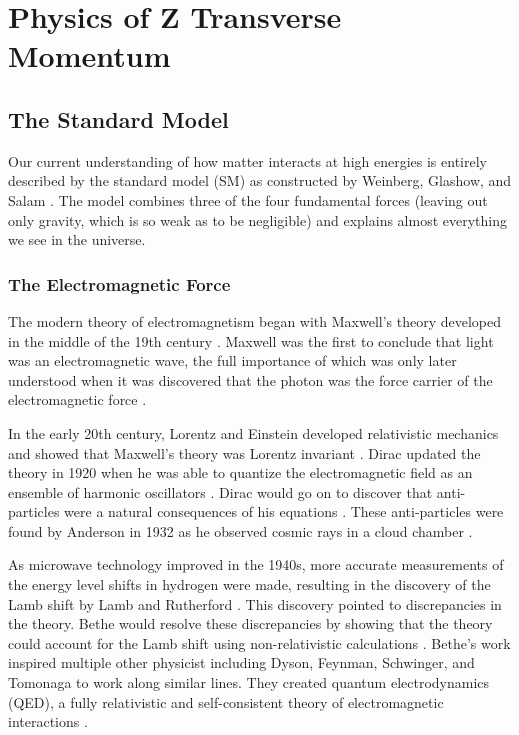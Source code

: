 \chapter{Physics of Z Transverse Momentum}
\label{chapter:theory}

\section{The Standard Model}
\label{section:standard_model}

Our current understanding of how matter interacts at high energies is entirely
described by the standard model (SM) as constructed by Weinberg, Glashow, and
Salam \cite{glashow1961}\cite{weinberg1967}\cite{salam1968}. The model combines
three of the four fundamental forces (leaving out only gravity, which is so
weak as to be negligible) and explains almost everything we see in the
universe.

\subsection{The Electromagnetic Force}
\label{subsection:electronmagnetic_force}

The modern theory of electromagnetism began with Maxwell's theory developed in
the middle of the 19th century \cite{maxwell1873}. Maxwell was the first to
conclude that light was an electromagnetic wave, the full importance of which
was only later understood when it was discovered that the photon was the force
carrier of the electromagnetic force \cite{maxwell1865}.

In the early 20th century, Lorentz and Einstein developed relativistic
mechanics and showed that Maxwell's theory was Lorentz invariant
\cite{lorentz1899}\cite{einstein1904}. Dirac updated the theory in 1920 when he
was able to quantize the electromagnetic field as an ensemble of harmonic
oscillators \cite{dirac1927}. Dirac would go on to discover that anti-particles
were a natural consequences of his equations \cite{dirac1928}\cite{dirac1930}.
These anti-particles were found by Anderson in 1932 as he observed cosmic rays
in a cloud chamber \cite{anderson1933}.

As microwave technology improved in the 1940s, more accurate measurements of
the energy level shifts in hydrogen were made, resulting in the discovery of
the Lamb shift by Lamb and Rutherford \cite{lamb1947}. This discovery pointed
to discrepancies in the theory. Bethe would resolve these discrepancies by
showing that the theory could account for the Lamb shift using non-relativistic
calculations \cite{bethe1947}. Bethe's work inspired multiple other physicist
including Dyson, Feynman, Schwinger, and Tomonaga to work along similar lines.
They created quantum electrodynamics (QED), a fully relativistic and
self-consistent theory of electromagnetic interactions
\cite{tomonaga1946}\cite{schwinger1948}\cite{feynman1949}\cite{dyson1949}.

